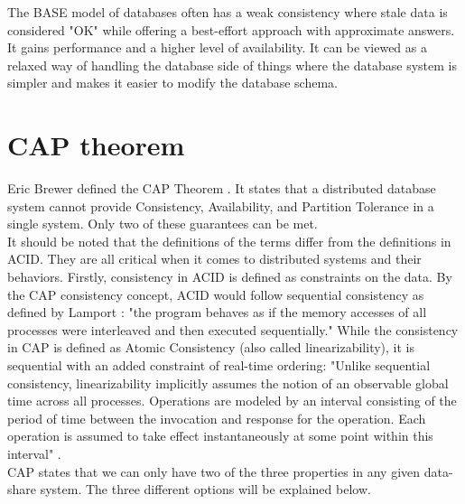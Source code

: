 \documentclass[a4paper,10pt,titlepage]{report}
\begin{document}
    The BASE model of databases often has a weak consistency where stale data is considered "OK" while offering a best-effort approach with approximate answers. It gains performance and a higher level of availability. It can be viewed as a relaxed way of handling the database side of things where the database system is simpler and makes it easier to modify the database schema.

    \section{CAP theorem}

    Eric Brewer defined the CAP Theorem \cite{CAP}. It states that a distributed database system cannot provide Consistency, Availability, and Partition Tolerance in a single system. Only two of these guarantees can be met.\\
    \vspace{5mm}
    It should be noted that the definitions of the terms differ from the definitions in ACID. They are all critical when it comes to distributed systems and their behaviors. Firstly, consistency in ACID is defined as constraints on the data. By the CAP consistency concept, ACID would follow sequential consistency as defined by Lamport \cite{lamport1993how}: "the program behaves as if the memory accesses of all processes were interleaved and then executed sequentially." While the consistency in CAP is defined as Atomic Consistency (also called linearizability), it is sequential with an added constraint of real-time ordering: "Unlike sequential consistency, linearizability implicitly assumes the notion of an observable global time across all processes. Operations are modeled by an interval consisting of the period of time between the invocation and response for the operation. Each operation is assumed to take effect instantaneously at some point within this interval" \cite{CSL-TR-95-685}. \\
    \vspace{5mm}
    CAP states that we can only have two of the three properties in any given data-share system. The three different options will be explained below.
\end{document}
